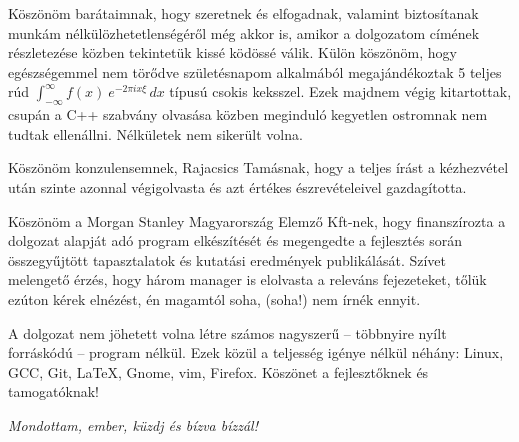Köszönöm barátaimnak, hogy szeretnek és elfogadnak, valamint biztosítanak munkám nélkülözhetetlenségéről még akkor is, amikor a dolgozatom címének részletezése közben tekintetük kissé ködössé válik. Külön köszönöm, hogy egészségemmel nem törődve születésnapom alkalmából megajándékoztak 5 teljes rúd $\int_{-\infty}^\infty f(x)\ e^{- 2\pi i x \xi}\,dx$ típusú csokis keksszel. Ezek majdnem végig kitartottak, csupán a C++ szabvány olvasása közben meginduló kegyetlen ostromnak nem tudtak ellenállni. Nélkületek nem sikerült volna.

Köszönöm konzulensemnek, Rajacsics Tamásnak, hogy a teljes írást a kézhezvétel után szinte azonnal végigolvasta és azt értékes észrevételeivel gazdagította.

Köszönöm a Morgan Stanley Magyarország Elemző Kft-nek, hogy finanszírozta a dolgozat alapját adó program elkészítését és megengedte a fejlesztés során összegyűjtött tapasztalatok és kutatási eredmények publikálását. Szívet melengető érzés, hogy három manager is elolvasta a releváns fejezeteket, tőlük ezúton kérek elnézést, én magamtól soha, (soha!) nem írnék ennyit.

A dolgozat nem jöhetett volna létre számos nagyszerű -- többnyire nyílt forráskódú -- program nélkül. Ezek közül a teljesség igénye nélkül néhány: Linux, GCC, Git, \LaTeX, Gnome, vim, Firefox. Köszönet a fejlesztőknek és tamogatóknak!

\vfill
\begin{center}
\emph{Mondottam, ember, küzdj és bízva bízzál!}
\end{center}
\thispagestyle{empty}
